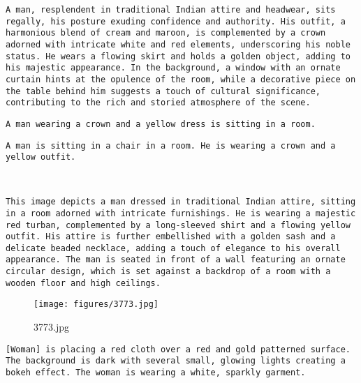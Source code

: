 \begin{lstlisting}[caption={Captions using Llama 3.2 for 3541.jpg}]
A man, resplendent in traditional Indian attire and headwear, sits regally, his posture exuding confidence and authority. His outfit, a harmonious blend of cream and maroon, is complemented by a crown adorned with intricate white and red elements, underscoring his noble status. He wears a flowing skirt and holds a golden object, adding to his majestic appearance. In the background, a window with an ornate curtain hints at the opulence of the room, while a decorative piece on the table behind him suggests a touch of cultural significance, contributing to the rich and storied atmosphere of the scene.
\end{lstlisting}


\begin{lstlisting}[caption={Captions using Phi 4 for 3541.jpg}]
A man wearing a crown and a yellow dress is sitting in a room.
\end{lstlisting}


\begin{lstlisting}[caption={Captions using Phi 4 with SAM 2 for 3541.jpg}]
A man is sitting in a chair in a room. He is wearing a crown and a yellow outfit.
\end{lstlisting}


\begin{lstlisting}[caption={Captions using Llama 3.2 with SAM 2 for 3541.jpg}]


This image depicts a man dressed in traditional Indian attire, sitting in a room adorned with intricate furnishings. He is wearing a majestic red turban, complemented by a long-sleeved shirt and a flowing yellow outfit. His attire is further embellished with a golden sash and a delicate beaded necklace, adding a touch of elegance to his overall appearance. The man is seated in front of a wall featuring an ornate circular design, which is set against a backdrop of a room with a wooden floor and high ceilings.
\end{lstlisting}

\clearpage
\begin{figure}[H]
    \centering
    \texttt{[image: figures/3773.jpg]}
    \caption{3773.jpg}
    \label{fig:3773.jpg}
\end{figure}



\begin{lstlisting}[caption={Captions using Ensemble without Llama for 3773.jpg}]
[Woman] is placing a red cloth over a red and gold patterned surface. The background is dark with several small, glowing lights creating a bokeh effect. The woman is wearing a white, sparkly garment.
\end{lstlisting}


